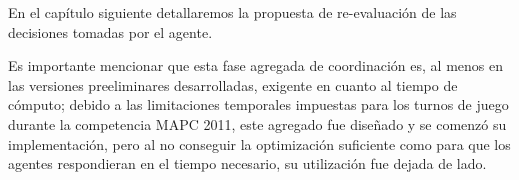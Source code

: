 En el capítulo siguiente detallaremos la propuesta de re-evaluación de
las decisiones tomadas por el agente. 

Es importante mencionar que esta
fase agregada de coordinación es, al menos en las versiones
preeliminares desarrolladas, exigente en cuanto al tiempo de cómputo;
debido a las limitaciones temporales impuestas para los turnos de
juego durante la competencia MAPC 2011, este agregado fue diseñado y
se comenzó su implementación, pero al no conseguir la optimización
suficiente como para que los agentes respondieran en el tiempo
necesario, su utilización fue dejada de lado.
